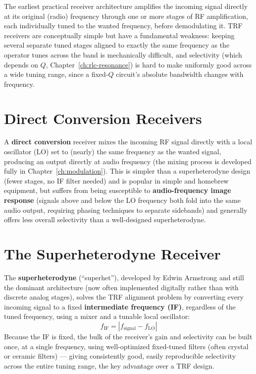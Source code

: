 The earliest practical receiver architecture amplifies the incoming
signal directly at its original (radio) frequency through one or more
stages of RF amplification, each individually tuned to the wanted
frequency, before demodulating it. TRF receivers are conceptually
simple but have a fundamental weakness: keeping several separate tuned
stages aligned to exactly the same frequency as the operator tunes
across the band is mechanically difficult, and selectivity (which
depends on $Q$, Chapter~\ref{ch:rlc-resonance}) is hard to make
uniformly good across a wide tuning range, since a fixed-$Q$ circuit's
absolute bandwidth changes with frequency.

\section{Direct Conversion Receivers}


A \textbf{direct conversion} receiver mixes the incoming RF signal
directly with a local oscillator (LO) set to (nearly) the same
frequency as the wanted signal, producing an output directly at audio
frequency (the mixing process is developed fully in
Chapter~\ref{ch:modulation}). This is simpler than a superheterodyne
design (fewer stages, no IF filter needed) and is popular in simple and
homebrew equipment, but suffers from being susceptible to
\textbf{audio-frequency image response} (signals above and below the LO
frequency both fold into the same audio output, requiring phasing
techniques to separate sidebands) and generally offers less overall
selectivity than a well-designed superheterodyne.

\section{The Superheterodyne Receiver}
\label{sec:superhet}


The \textbf{superheterodyne} (``superhet''), developed by Edwin
Armstrong and still the dominant architecture (now often implemented
digitally rather than with discrete analog stages), solves the TRF
alignment problem by converting every incoming signal to a fixed
\textbf{intermediate frequency (IF)}, regardless of the tuned frequency,
using a mixer and a tunable local oscillator:
\[
\boxed{f_{\text{IF}} = |f_{\text{signal}} - f_{\text{LO}}|}
\]
Because the IF is fixed, the bulk of the receiver's gain and
selectivity can be built once, at a single frequency, using
well-optimized fixed-tuned filters (often crystal or ceramic filters)
--- giving consistently good, easily reproducible selectivity across the
entire tuning range, the key advantage over a TRF design.

